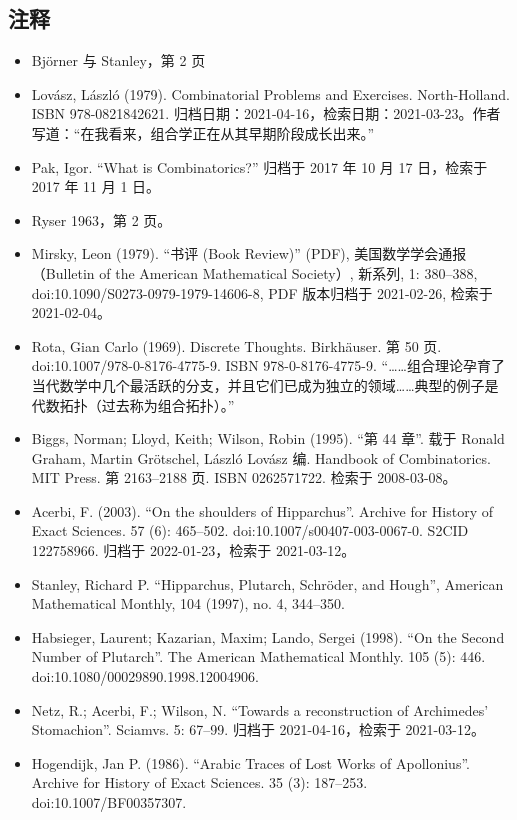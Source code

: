 \subsection{注释}
\begin{itemize}
  \item Björner 与 Stanley，第 2 页  
  \item Lovász, László (1979). Combinatorial Problems and Exercises. North-Holland. ISBN 978-0821842621. 归档日期：2021-04-16，检索日期：2021-03-23。作者写道：“在我看来，组合学正在从其早期阶段成长出来。”  
  \item Pak, Igor. “What is Combinatorics?” 归档于 2017 年 10 月 17 日，检索于 2017 年 11 月 1 日。  
  \item Ryser 1963，第 2 页。  
  \item Mirsky, Leon (1979). “书评 (Book Review)” (PDF), 美国数学学会通报（Bulletin of the American Mathematical Society）, 新系列, 1: 380–388, doi:10.1090/S0273-0979-1979-14606-8, PDF 版本归档于 2021-02-26, 检索于 2021-02-04。  
  \item Rota, Gian Carlo (1969). Discrete Thoughts. Birkhäuser. 第 50 页. doi:10.1007/978-0-8176-4775-9. ISBN 978-0-8176-4775-9.  
  “……组合理论孕育了当代数学中几个最活跃的分支，并且它们已成为独立的领域……典型的例子是代数拓扑（过去称为组合拓扑）。”  
  \item Biggs, Norman; Lloyd, Keith; Wilson, Robin (1995). “第 44 章”. 载于 Ronald Graham, Martin Grötschel, László Lovász 编. Handbook of Combinatorics. MIT Press. 第 2163–2188 页. ISBN 0262571722. 检索于 2008-03-08。  
  \item Acerbi, F. (2003). “On the shoulders of Hipparchus”. Archive for History of Exact Sciences. 57 (6): 465–502. doi:10.1007/s00407-003-0067-0. S2CID 122758966. 归档于 2022-01-23，检索于 2021-03-12。  
  \item Stanley, Richard P. “Hipparchus, Plutarch, Schröder, and Hough”, American Mathematical Monthly, 104 (1997), no. 4, 344–350.  
  \item Habsieger, Laurent; Kazarian, Maxim; Lando, Sergei (1998). “On the Second Number of Plutarch”. The American Mathematical Monthly. 105 (5): 446. doi:10.1080/00029890.1998.12004906.  
  \item Netz, R.; Acerbi, F.; Wilson, N. “Towards a reconstruction of Archimedes' Stomachion”. Sciamvs. 5: 67–99. 归档于 2021-04-16，检索于 2021-03-12。  
  \item Hogendijk, Jan P. (1986). “Arabic Traces of Lost Works of Apollonius”. Archive for History of Exact Sciences. 35 (3): 187–253. doi:10.1007/BF00357307.  

\end{itemize}
